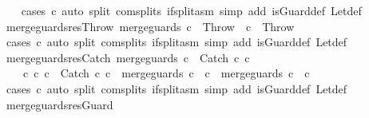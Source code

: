 \begin{isabellebody}
%
\isadelimproof
\ \ %
\endisadelimproof
%
\isatagproof
{}\isamarkupfalse%
\ {\isacharparenleft}cases\ c{\isacharparenright}\ {\isacharparenleft}auto\ split{\isacharcolon}\ com{\isachardot}splits\ if{\isacharunderscore}split{\isacharunderscore}asm\ simp\ add{\isacharcolon}\ is{\isacharunderscore}Guard{\isacharunderscore}def\ Let{\isacharunderscore}def{\isacharparenright}%
\endisatagproof
{\isafoldproof}%
%
\isadelimproof
\isanewline
%
\endisadelimproof
\isanewline
{}\isamarkupfalse%
\ merge{\isacharunderscore}guards{\isacharunderscore}res{\isacharunderscore}Throw{\isacharcolon}\ {\isachardoublequoteopen}merge{\isacharunderscore}guards\ c\ {\isacharequal}\ Throw\ {\isasymLongrightarrow}\ c\ {\isacharequal}\ Throw{\isachardoublequoteclose}\isanewline
%
\isadelimproof
\ \ %
\endisadelimproof
%
\isatagproof
{}\isamarkupfalse%
\ {\isacharparenleft}cases\ c{\isacharparenright}\ {\isacharparenleft}auto\ split{\isacharcolon}\ com{\isachardot}splits\ if{\isacharunderscore}split{\isacharunderscore}asm\ simp\ add{\isacharcolon}\ is{\isacharunderscore}Guard{\isacharunderscore}def\ Let{\isacharunderscore}def{\isacharparenright}%
\endisatagproof
{\isafoldproof}%
%
\isadelimproof
\isanewline
%
\endisadelimproof
\isanewline
{}\isamarkupfalse%
\ merge{\isacharunderscore}guards{\isacharunderscore}res{\isacharunderscore}Catch{\isacharcolon}\ {\isachardoublequoteopen}merge{\isacharunderscore}guards\ c\ {\isacharequal}\ Catch\ c{}\ c{}\ {\isasymLongrightarrow}\ \isanewline
\ \ \ \ {\isasymexists}c{}{\isacharprime}\ c{}{\isacharprime}{\isachardot}\ c\ {\isacharequal}\ Catch\ c{}{\isacharprime}\ c{}{\isacharprime}\ {\isasymand}\ merge{\isacharunderscore}guards\ c{}{\isacharprime}\ {\isacharequal}\ c{}\ {\isasymand}\ merge{\isacharunderscore}guards\ c{}{\isacharprime}\ {\isacharequal}\ c{}{\isachardoublequoteclose}\isanewline
%
\isadelimproof
\ \ %
\endisadelimproof
%
\isatagproof
{}\isamarkupfalse%
\ {\isacharparenleft}cases\ c{\isacharparenright}\ {\isacharparenleft}auto\ split{\isacharcolon}\ com{\isachardot}splits\ if{\isacharunderscore}split{\isacharunderscore}asm\ simp\ add{\isacharcolon}\ is{\isacharunderscore}Guard{\isacharunderscore}def\ Let{\isacharunderscore}def{\isacharparenright}%
\endisatagproof
{\isafoldproof}%
%
\isadelimproof
\isanewline
%
\endisadelimproof
\isanewline
{}\isamarkupfalse%
\ merge{\isacharunderscore}guards{\isacharunderscore}res{\isacharunderscore}Guard{\isacharcolon}\ \isanewline

\end{isabellebody}
